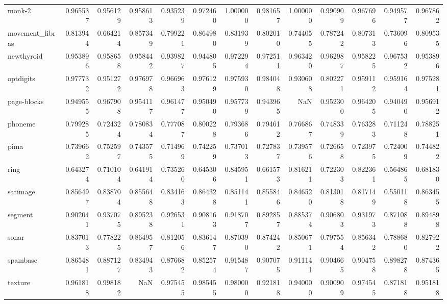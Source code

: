 \begin{tabular}{lrrrrrrrrrrrr}
monk-2          &   0.965537 &  0.956129 &  0.958613 &  0.935239 &  0.972460 &  1.000000 &  0.981657 &  1.000000 &  0.990909 &  0.967696 &  0.949577 &  0.967862 \\
movement\_libras &   0.813944 &  0.664214 &  0.857349 &  0.799221 &  0.864980 &  0.831939 &  0.802010 &  0.744055 &  0.787242 &  0.807313 &  0.736096 &  0.809535 \\
newthyroid      &   0.953896 &  0.958658 &  0.958442 &  0.939827 &  0.944805 &  0.972294 &  0.972511 &  0.963420 &  0.962987 &  0.958225 &  0.967532 &  0.953896 \\
optdigits       &   0.977732 &  0.951272 &  0.976978 &  0.966963 &  0.976129 &  0.975930 &  0.984048 &  0.930608 &  0.802271 &  0.959112 &  0.959164 &  0.975281 \\
page-blocks     &   0.949555 &  0.967908 &  0.954117 &  0.961477 &  0.950490 &  0.957739 &  0.943965 &       NaN &  0.952300 &  0.964205 &  0.940490 &  0.956912 \\
phoneme         &   0.799285 &  0.724324 &  0.780834 &  0.777087 &  0.800228 &  0.793686 &  0.794612 &  0.766867 &  0.748339 &  0.763283 &  0.711248 &  0.788251 \\
pima            &   0.739662 &  0.752597 &  0.743575 &  0.714969 &  0.742259 &  0.737013 &  0.727837 &  0.739576 &  0.726658 &  0.723975 &  0.724009 &  0.744822 \\
ring            &   0.643274 &  0.710104 &  0.641914 &  0.735260 &  0.645306 &  0.845951 &  0.661573 &  0.816211 &  0.722303 &  0.822361 &  0.564865 &  0.681830 \\
satimage        &   0.856497 &  0.838704 &  0.855648 &  0.834163 &  0.864328 &  0.851141 &  0.855846 &  0.846520 &  0.813018 &  0.817149 &  0.550118 &  0.863455 \\
segment         &   0.902041 &  0.937075 &  0.895238 &  0.926531 &  0.908163 &  0.918707 &  0.892857 &  0.885374 &  0.906803 &  0.931973 &  0.871088 &  0.894898 \\
sonar           &   0.837013 &  0.778225 &  0.864957 &  0.812056 &  0.836147 &  0.870390 &  0.874242 &  0.850671 &  0.797554 &  0.856342 &  0.788680 &  0.827922 \\
spambase        &   0.865481 &  0.887127 &  0.834943 &  0.876682 &  0.852574 &  0.915487 &  0.907075 &  0.911141 &  0.904665 &  0.904758 &  0.898278 &  0.874365 \\
texture         &   0.961818 &  0.998182 &       NaN &  0.975455 &  0.985455 &  0.980000 &  0.921818 &  0.940000 &  0.900909 &  0.974545 &  0.871818 &  0.951818 \\

\end{tabular}
